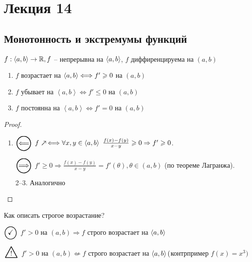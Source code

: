 \section{Лекция 14}

\subsection{Монотонность и экстремумы функций}

\begin{theorem} 
    $f: \left\langle {a, b} \right\rangle \to \mathbb{R}, f $ -- непрерывна на $\left\langle {a, b} \right\rangle$, $f$ диффиренцируема на $(a, b)$

    \begin{enumerate}
        \item $f$ возрастает на $\left\langle {a, b} \right\rangle \Longleftrightarrow f' \geqslant 0 $ на $(a, b)$ 
        \item $f$ убывает на $\left\langle {a,b} \right\rangle \Longleftrightarrow f'  \leqslant 0 $ на $(a, b)$ 
        \item $f$ постоянна на $\left\langle {a,b} \right\rangle  \Longleftrightarrow f' = 0 $ на $(a, b)$ 
    \end{enumerate}

\end{theorem}

\begin{proof} \quad
    \begin{enumerate}
        \item $\ola$ $f \inc \Longleftrightarrow \forall x, y \in \useg{a, b} \,\, \frac{f(x) - f(y)}{x - y} \geqslant 0 \Rightarrow f' \geqslant 0$. \\\\
        $\ora$ $f' \geqslant 0 \Rightarrow \frac{f(x)-f(y)}{x-y} = f'(\theta), \theta \in (a, b)$ (по теореме Лагранжа).
        \item[2--3.] Аналогично
    \end{enumerate}
\end{proof}

\begin{remark}
    Как описать строгое возрастание? 
\end{remark}

$\ok$ $f' > 0$ на $(a, b) \Rightarrow f $ строго возрастает на $\left\langle {a, b} \right\rangle $
\\\\
$\but$ $f' > 0$ на $(a, b) \not\Leftarrow f $ строго возрастает на $\left\langle {a, b} \right\rangle ($контрпример $f(x) = x ^ 3)$ 

